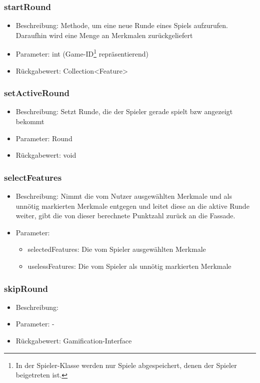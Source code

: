 \documentclass[a4paper]{scrreprt}
\begin{document}
    \subsubsection{startRound}
    \begin{itemize}
        \item Beschreibung: Methode, um eine neue Runde eines Spiels aufzurufen. Daraufhin wird eine Menge an Merkmalen zurückgeliefert
        \item Parameter: int (Game-ID\footnote{In der Spieler-Klasse werden nur Spiele abgespeichert, denen der Spieler beigetreten ist.} repräsentierend)
        \item Rückgabewert: Collection<Feature>
    \end{itemize}
    \subsubsection{setActiveRound}
    \begin{itemize}
        \item Beschreibung: Setzt Runde, die der Spieler gerade spielt bzw angezeigt bekommt
        \item Parameter: Round
        \item Rückgabewert: void
    \end{itemize}
    \subsubsection{selectFeatures}
    \begin{itemize}
        \item Beschreibung: Nimmt die vom Nutzer ausgewählten Merkmale und als unnötig markierten Merkmale entgegen und leitet diese an die aktive Runde weiter, gibt die von dieser berechnete Punktzahl zurück an die Fassade.
        \item Parameter:
        \begin{itemize}
            \item selectedFeatures: Die vom Spieler ausgewählten Merkmale
            \item uselessFeatures: Die vom Spieler als unnötig markierten Merkmale
        \end{itemize}
    \end{itemize}
    \subsubsection{skipRound}
    \begin{itemize}
        \item Beschreibung: %
        \item Parameter: -
        \item Rückgabewert: Gamification-Interface
    \end{itemize}
\end{document}
